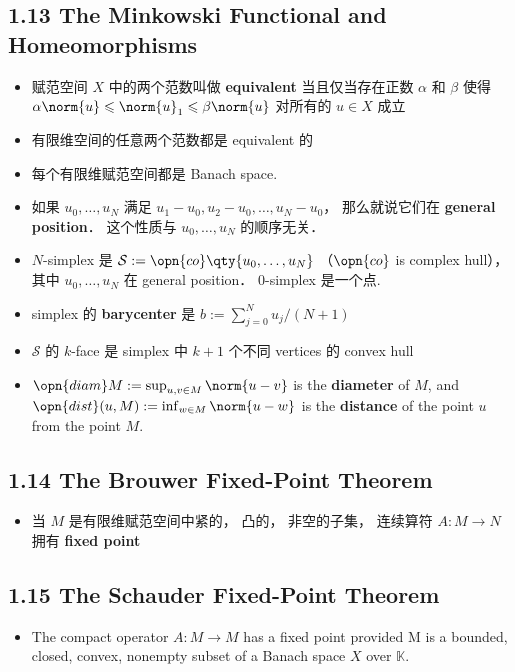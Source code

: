 \subsection{1.13 The Minkowski Functional and Homeomorphisms}
\begin{itemize}
\item 赋范空间 $X$ 中的两个范数叫做 \textbf{equivalent} 当且仅当存在正数 $\alpha$ 和 $\beta$ 使得 $\alpha \norm{u} \leqslant \norm{u}_1 \leqslant \beta \norm{u}$ 对所有的 $u \in X$ 成立

\item 有限维空间的任意两个范数都是 equivalent 的

\item 每个有限维赋范空间都是 Banach space.

\item 如果 $u_0, \dots, u_N$  满足 $u_1 - u_0, u_2 - u_0,\dots, u_N - u_0$， 那么就说它们在 \textbf{general position}． 这个性质与 $u_0, \dots, u_N$ 的顺序无关．

\item $N$-simplex 是 $\mathcal S := \opn{co}\qty{u_0, \dots, u_N}$ （$\opn{co}$ is complex hull）， 其中 $u_0, \dots, u_N$ 在 general position． $0$-simplex 是一个点.

\item simplex 的 \textbf{barycenter} 是 $b := \sum_{j=0}^N u_j / (N+1)$

\item $\mathcal S$ 的 $k$-face 是 simplex 中 $k+1$ 个不同 vertices 的 convex hull

\item $\opn{diam} M := \sup_{u, v\in M} \norm{u - v}$ is the \textbf{diameter} of $M$, and $\opn{dist}(u, M) := \inf_{w \in M} \norm{u - w}$ is the \textbf{distance} of the point $u$ from the point $M$.
\end{itemize}

\subsection{1.14 The Brouwer Fixed-Point Theorem}

\begin{itemize}
\item 当 $M$ 是有限维赋范空间中紧的， 凸的， 非空的子集， 连续算符 $A: M \to N$ 拥有 \textbf{fixed point}
\end{itemize}

\subsection{1.15 The Schauder Fixed-Point Theorem}
\begin{itemize}
\item The compact operator $A: M \to M$ has a fixed point provided M is a bounded, closed, convex, nonempty subset of a Banach space $X$ over $\mathbb K$.
\end{itemize}

